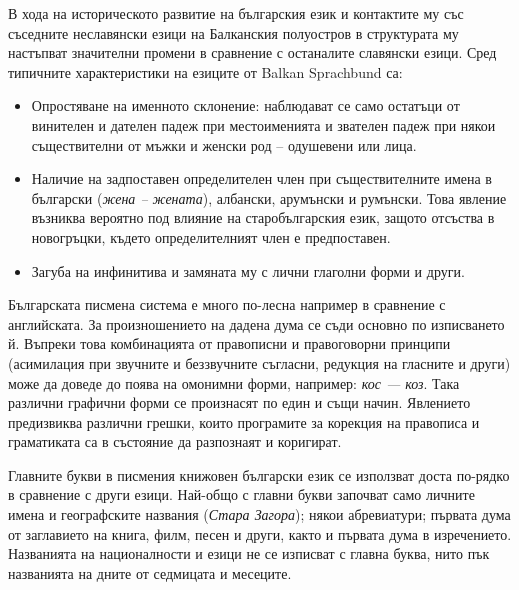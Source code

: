 \documentclass[]{../../metanetpaper}
\begin{document}
\begin{multicols}{2}
В хода на историческото развитие на българския език и
 контактите му със съседните неславянски езици на Балканския полуостров в структурата му настъпват значителни промени в сравнение с останалите славянски
 езици. Сред типичните характеристики на езиците от
 Balkan Sprachbund са:

\begin{itemize}
\item Опростяване на именното склонение: наблюдават се
 само остатъци от винителен и дателен падеж при
 местоименията и звателен падеж при някои съществителни от мъжки и женски род – одушевени
 или лица.

\item Наличие на задпоставен определителен член при съществителните имена в български ({\it жена – жената}),
 албански, арумънски и румънски. Това явление възниква вероятно под влияние на старобългарския език,
 защото отсъства в новогръцки, където определителният член е предпоставен.

\item Загуба на инфинитива и замяната му с лични
глаголни форми и други. 
\end{itemize}


Българската писмена система е много по-лесна
например в сравнение с
 английската.
 За произношението на дадена дума се съди основно по изписването
 й. Въпреки това комбинацията от правописни и
 правоговорни принципи (асимилация при звучните и
 беззвучните съгласни, редукция на гласните и други)
 може да доведе до поява на омонимни форми, например:
\textit{кос — коз}. Така различни графични форми се произнасят
 по един и същи начин. Явлението предизвиква различни
 грешки, които програмите за корекция на правописа и
граматиката са в състояние да разпознаят и коригират.

Главните букви в писмения книжовен български език се използват доста по-рядко в сравнение с други езици. Най-общо с главни букви започват само личните имена и географските названия
 ({\it Стара Загора}); някои абревиатури; първата дума от
 заглавието на книга, филм, песен и други, както и първата дума в 
изречението. Названията на
 националности и езици не се изписват с главна буква,
 нито пък названията на дните от
 седмицата и месеците.



\end{multicols}
\end{document}
